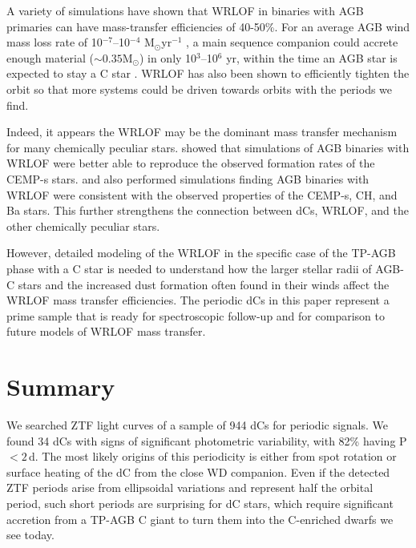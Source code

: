 \documentclass[twocolumn]{aastex631}
\begin{document}
A variety of simulations \citep{Abate2013, Saladino2018, Saladino2019a, Saladino2019b} have shown that WRLOF in binaries with AGB primaries can have mass-transfer efficiencies of 40-50\%. For an average AGB wind mass loss rate of 10$^{-7}$--10$^{-4}$ M$_\odot$yr$^{-1}$ \citep{Hofner2015}, a main sequence companion could accrete enough material ($\sim 0.35$M$_\odot$) in only 10$^{3}$--10$^{6}$ yr, within the time an AGB star is expected to stay a C star \citep[10$^6$yr;][]{Marigo2017}. WRLOF has also been shown to efficiently tighten the orbit \citep{Saladino2018, Chen2018} so that more systems could be driven towards orbits with the periods we find.

Indeed, it appears the WRLOF may be the dominant mass transfer mechanism for many chemically peculiar stars. \citet{Abate2013} showed that simulations of AGB binaries with WRLOF were better able to reproduce the observed formation rates of the CEMP-s stars. \citet{Saladino2019a} and \citet{Saladino2019b} also performed simulations finding AGB binaries with WRLOF were consistent with the observed properties of the CEMP-s, CH, and Ba stars. This further strengthens the connection between dCs, WRLOF, and the other chemically peculiar stars.

However, detailed modeling of the WRLOF in the specific case of the TP-AGB phase with a C star is needed to understand how the larger stellar radii of AGB-C stars and the increased dust formation often found in their winds affect the WRLOF mass transfer efficiencies. The periodic dCs in this paper represent a prime sample that is ready for spectroscopic follow-up and for comparison to future models of WRLOF mass transfer.

\section{Summary}\label{sec:summary}

We searched ZTF light curves of a sample of 944 dCs for periodic signals. We found 34 dCs with signs of significant photometric variability, with 82\% having P$< 2$\,d. The most likely origins of this periodicity is either from spot rotation or surface heating of the dC from the close WD companion. Even if the detected ZTF periods arise from ellipsoidal variations and represent half the orbital period, such short periods are surprising for dC stars, which require significant accretion from a TP-AGB C giant to turn them into the C-enriched dwarfs we see today.
\end{document}
